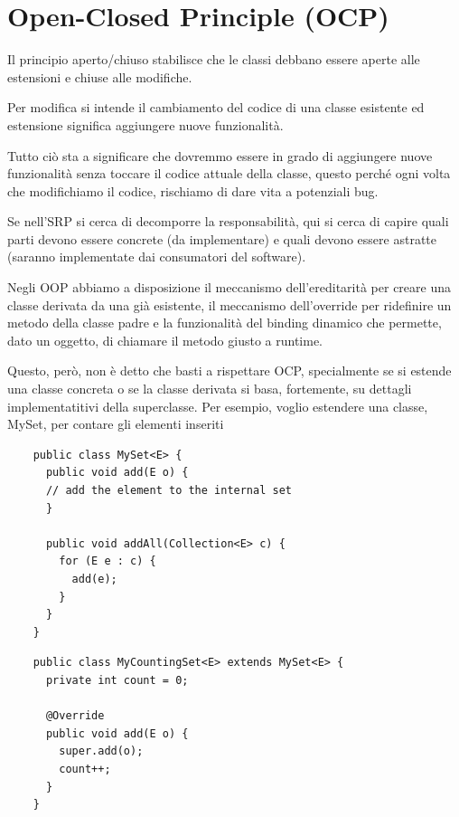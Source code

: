 \section{Open-Closed Principle (OCP)}

Il principio aperto/chiuso stabilisce che le classi debbano essere aperte alle estensioni e chiuse alle modifiche.

Per modifica si intende il cambiamento del codice di una classe esistente ed estensione significa aggiungere nuove funzionalità.

Tutto ciò sta a significare che dovremmo essere in grado di aggiungere nuove funzionalità senza toccare il codice attuale della classe, questo perché ogni volta che modifichiamo il codice,
rischiamo di dare vita a potenziali bug.

Se nell'SRP si cerca di decomporre la responsabilità, qui si cerca di capire quali parti devono essere concrete (da implementare) e quali devono essere astratte (saranno implementate dai 
consumatori del software).

Negli OOP abbiamo a disposizione il meccanismo dell'ereditarità per creare una classe derivata da una già esistente, il meccanismo dell'override per ridefinire un metodo della classe 
padre e la funzionalità del binding dinamico che permette, dato un oggetto, di chiamare il metodo giusto a runtime.

Questo, però, non è detto che basti a rispettare OCP, specialmente se si estende una classe concreta o se la classe derivata si basa, fortemente, su dettagli implementatitivi della superclasse.
Per esempio, voglio estendere una classe, MySet, per contare gli elementi inseriti

\begin{multicols}{2}
  \begin{lstlisting}
    public class MySet<E> {
      public void add(E o) {
      // add the element to the internal set
      }

      public void addAll(Collection<E> c) {
        for (E e : c) {
          add(e);
        }
      }
    }
  \end{lstlisting}
  \columnbreak
  \begin{lstlisting}
    public class MyCountingSet<E> extends MySet<E> {
      private int count = 0;
      
      @Override
      public void add(E o) {
        super.add(o);
        count++;
      }
    } 
  \end{lstlisting}
\end{multicols}

